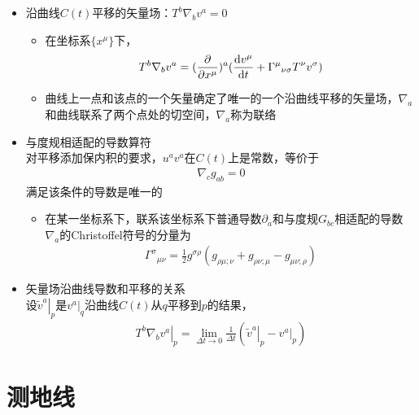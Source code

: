 \begin{itemize}
    \item 沿曲线$C(t)$平移的矢量场：$T^b \nabla_b v^a=0$
    \begin{itemize}
        \item 在坐标系$\{x^{\mu}\}$下，
        \begin{gather*}
            T^b \nabla_b v^a=(\frac{\partial }{\partial x^{\mu}})^a (\frac{\mathrm{d} v^{\mu}}{\mathrm{d} t}+{\Gamma^{\mu}}_{\nu\sigma}T^{\nu}v^{\sigma})
        \end{gather*}
        \item 曲线上一点和该点的一个矢量确定了唯一的一个沿曲线平移的矢量场，$\nabla_a$和曲线联系了两个点处的切空间，$\nabla_a$称为联络
    \end{itemize}
    \item 与度规相适配的导数算符\\
    对平移添加保内积的要求，$u^a v^a$在$C(t)$上是常数，等价于
    \begin{gather*}
        \nabla_c g_{ab}=0
    \end{gather*}
    满足该条件的导数是唯一的
    \begin{itemize}
        \item 在某一坐标系下，联系该坐标系下普通导数$\partial_a$和与度规$G_{bc}$相适配的导数$\nabla_a$的Christoffel符号的分量为
        \begin{gather*}
            {\Gamma^{\sigma}}_{\mu\nu}=\frac{1}{2}g^{\sigma \rho}(g_{\rho \mu;\nu}+g_{\rho \nu;\mu}-g_{\mu \nu ;\rho})
        \end{gather*}
    \end{itemize}
    \item 矢量场沿曲线导数和平移的关系\\
    设$\left. \tilde{v}^a \right|_p$是$\left. v^a \right|_q$沿曲线$C(t)$从$q$平移到$p$的结果，
    \begin{gather*}
        \left.T^b \nabla_b v^a \right|_p=\lim_{\Delta t \to 0} \frac{1}{\Delta t} (\left. \tilde{v}^a \right|_p-\left. v^a \right|_p)
    \end{gather*}
\end{itemize}

\section{测地线}

